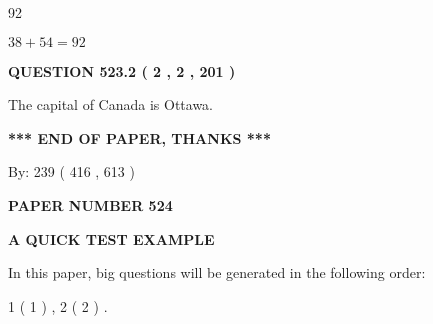 \documentclass[12pt]{article}
\begin{document}
92
 
 
 
 
\noindent{}

$ %
38 +  %
54=   %
92$
 
 
  
\vspace{0.2in}
  
{\textbf{\Large{QUESTION
523.2 
 ( 2 , 2 , 201 )
}}}
  
  
 
 
\noindent{}
 
 
The capital of Canada is Ottawa.
 
 
 
 
   
   
 \vspace{0.2in}
 
   
   
   
   
\vspace{1.0in} 
{\textbf{\large{ *** END OF PAPER, THANKS *** }}} 
   
   
\hspace{1.0in} By: 
 239 ( 416 ,  613 )
   
   
   
   
\newpage 
\setcounter{page}{ 
   524001 } 
   
   
   
   
 {\textbf{ \Large{ PAPER NUMBER  524  }}}
   
   
\vspace{0.2in}
   
   
   
   
   
   
 \vspace{0.2in}
{\LARGE {\textbf{ A QUICK TEST EXAMPLE}}}
   
   
   
\vspace{0.2in}
   
In this paper, big questions will be generated in the following order: 
   
   
   1 ( 1 )
 ,
   2 ( 2 )
 .
  
\vspace{0.2in}
  
\end{document}
